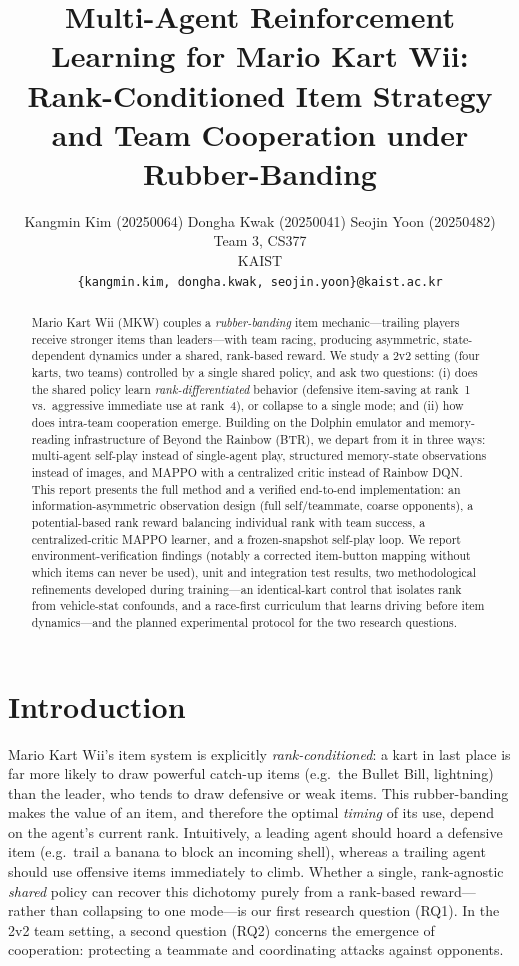 \documentclass{article}
\title{Multi-Agent Reinforcement Learning for Mario Kart Wii:\\
Rank-Conditioned Item Strategy and Team Cooperation under Rubber-Banding}
\author{%
  Kangmin Kim (20250064) \quad Dongha Kwak (20250041) \quad Seojin Yoon (20250482) \\
  Team 3, CS377 \\
  KAIST \\
  \texttt{\{kangmin.kim, dongha.kwak, seojin.yoon\}@kaist.ac.kr} \\
}
\begin{document}
\maketitle


\begin{abstract}
Mario Kart Wii (MKW) couples a \emph{rubber-banding} item mechanic---trailing
players receive stronger items than leaders---with team racing, producing
asymmetric, state-dependent dynamics under a shared, rank-based reward. We study
a 2v2 setting (four karts, two teams) controlled by a single shared policy, and
ask two questions: (i) does the shared policy learn \emph{rank-differentiated}
behavior (defensive item-saving at rank~1 vs.\ aggressive immediate use at
rank~4), or collapse to a single mode; and (ii) how does intra-team cooperation
emerge. Building on the Dolphin emulator and memory-reading infrastructure of
Beyond the Rainbow (BTR), we depart from it in three ways: multi-agent self-play
instead of single-agent play, structured memory-state observations instead of
images, and MAPPO with a centralized critic instead of Rainbow DQN. This report
presents the full method and a verified end-to-end implementation: an
information-asymmetric observation design (full self/teammate, coarse
opponents), a potential-based rank reward balancing individual rank with
team success, a centralized-critic MAPPO learner, and a frozen-snapshot
self-play loop. We report environment-verification findings (notably a corrected
item-button mapping without which items can never be used), unit and integration
test results, two methodological refinements developed during training---an
identical-kart control that isolates rank from vehicle-stat confounds, and a
race-first curriculum that learns driving before item dynamics---and the planned
experimental protocol for the two research questions.
\end{abstract}


\section{Introduction}

Mario Kart Wii's item system is explicitly \emph{rank-conditioned}: a kart in
last place is far more likely to draw powerful catch-up items (e.g.\ the
Bullet Bill, lightning) than the leader, who tends to draw defensive or weak
items. This rubber-banding makes the value of an item, and therefore the optimal
\emph{timing} of its use, depend on the agent's current rank. Intuitively, a
leading agent should hoard a defensive item (e.g.\ trail a banana to block an
incoming shell), whereas a trailing agent should use offensive items
immediately to climb. Whether a single, rank-agnostic \emph{shared} policy can
recover this dichotomy purely from a rank-based reward---rather than collapsing
to one mode---is our first research question (RQ1). In the 2v2 team setting, a
second question (RQ2) concerns the emergence of cooperation: protecting a
teammate and coordinating attacks against opponents.
\end{document}
